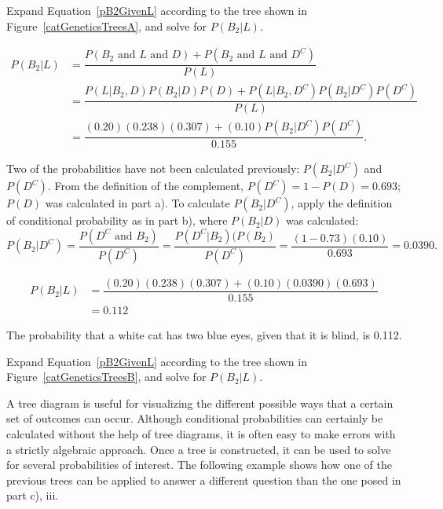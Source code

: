 \begin{examplewrap}
\begin{nexample}{Expand Equation~\ref{pB2GivenL} according to the tree shown in Figure~\ref{catGeneticsTreesA}, and solve for $P(B_2|L)$.}
	
\begin{align*}
P(B_2|L) &= \dfrac{P(B_2 \textrm{ and } L \textrm{ and } D) + P(B_2 \textrm{ and } L \textrm{ and } D^C)}{P(L)} \\
&= \dfrac{P(L|B_2, D)P(B_2|D)P(D) + P(L|B_2, D^C)P(B_2|D^C)P(D^C)}{P(L)} \\
&= \dfrac{(0.20)(0.238)(0.307) + (0.10)P(B_2|D^C)P(D^C)}{0.155}.
\end{align*}

Two of the probabilities have not been calculated previously: $P(B_2|D^C)$ and $P(D^C)$. From the definition of the complement, $P(D^C) = 1 - P(D) = 0.693$; $P(D)$ was calculated in part a). To calculate $P(B_2|D^C)$, apply the definition of conditional probability as in part b), where $P(B_2|D)$ was calculated:
\[P(B_2|D^C) = \dfrac{P(D^C \textrm{ and } B_2)}{P(D^C)} = \dfrac{P(D^C|B_2)(P(B_2)}{P(D^C)} = \dfrac{(1-0.73)(0.10)}{0.693} = 0.0390.\]

\begin{align*}
P(B_2|L) &= \dfrac{(0.20)(0.238)(0.307) + (0.10)(0.0390)(0.693)}{0.155} \\
&= 0.112
\end{align*}
	
The probability that a white cat has two blue eyes, given that it is blind, is 0.112.
\end{nexample}
\end{examplewrap}

\begin{exercisewrap}
\begin{nexercise}
Expand Equation~\ref{pB2GivenL} according to the tree shown in Figure~\ref{catGeneticsTreesB}, and solve for $P(B_2|L)$.\footnotemark{}
\end{nexercise}
\end{exercisewrap}
\footnotetext{\[P(B_2|L) = \frac{P(L|B_2, D)P(D|B_2)P(B_2) + P(L|B_2, D^C)P(D^C|B_2)P(B_2)}{P(L)} = \frac{(0.20)(0.73)(0.10) + (0.10)(1-0.73)(0.10)}{0.155} = 0.112.\]}

A tree diagram is useful for visualizing the different possible ways that a certain set of outcomes can occur. Although conditional probabilities can certainly be calculated without the help of tree diagrams, it is often easy to make errors with a strictly algebraic approach. Once a tree is constructed, it can be used to solve for several probabilities of interest. The following example shows how one of the previous trees can be applied to answer a different question than the one posed in part c), iii.

